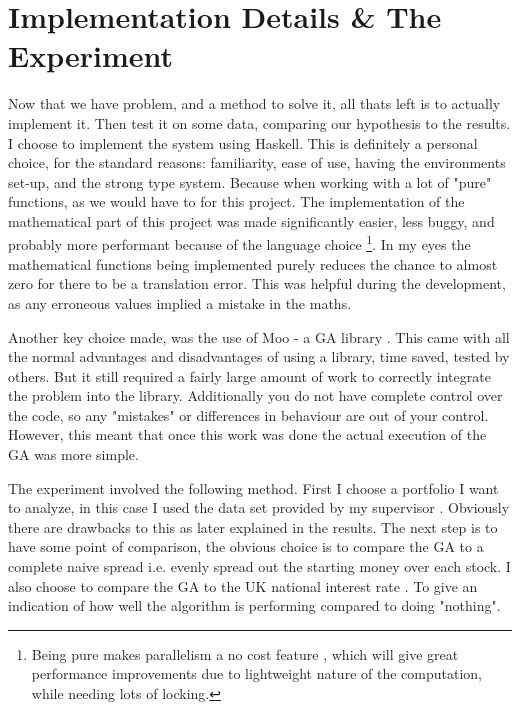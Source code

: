\documentclass[11pt]{article}
\begin{document}
\section{Implementation Details \& The Experiment}

    Now that we have problem, and a method to solve it, all thats left is to actually
    implement it. Then test it on some data, comparing our hypothesis to the results.
    I choose to implement the system using Haskell. This is definitely a personal
    choice, for the standard reasons: familiarity, ease of use, having the environments
    set-up, and the strong type system. Because when working with a lot of "pure"
    functions, as we would have to for this project. The implementation 
    of the mathematical part of this project was made significantly
    easier, less buggy, and probably more performant because of the language choice
    \footnote{Being pure makes parallelism a no cost feature \cite{HarrisMarlowJones, Chakravarty}, 
    which will give great performance improvements due to lightweight nature of the 
    computation, while needing lots of locking. }.
    In my eyes the mathematical functions
    being implemented purely reduces the chance to almost zero for there to be a translation
    error. This was helpful during the development, as any erroneous values implied a mistake
    in the maths.

    Another key choice made, was the use of Moo - a GA library \cite{Moo}. This came with all
    the normal advantages and disadvantages of using a library, time saved, tested by others.
    But it still required a fairly large amount of work to correctly integrate the
    problem into the library. Additionally you do not have complete control over the code,
    so any "mistakes" or differences in behaviour are out of your control. However,
    this meant that once this work was done the actual execution of the GA was more simple.

    The experiment involved the following method. First I choose a portfolio I want to
    analyze, in this case I used the data set provided by my supervisor \cite{Dataset}.
    Obviously there are drawbacks to this as later explained in the results. The next step is
    to have some point of comparison, the obvious choice is to compare the GA to
    a complete naive spread i.e. evenly spread out the starting money over each stock.
    I also choose to compare the GA to the UK national interest rate \cite{BankOfE} . To give an
    indication of how well the algorithm is performing compared to doing "nothing".
\end{document}
